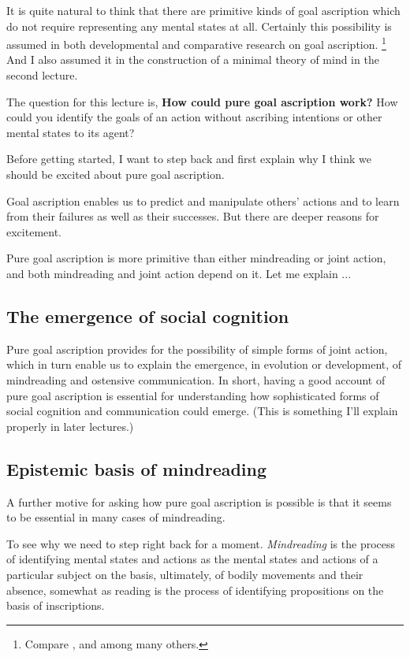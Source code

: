 \documentclass[12pt,\papersize]{extarticle}
\begin{document}
It is quite natural to think that there are primitive kinds of goal ascription which do not require  representing any mental states at all.
Certainly this possibility is assumed  in both developmental and comparative research on goal ascription.%
\footnote{ 
Compare \citet{Gergely:1995sq},
	\citet{Woodward:1998dm} and
	\citet{Penn:2007ey}
among many others.
}
And I also assumed it in the construction of a minimal theory of mind in the second lecture.


The question for this lecture is,
\newcommand{\theQuestion}{How could pure goal ascription work? }
\textbf{\theQuestion} 
How could you identify the goals of an action without ascribing intentions or other mental states to its agent?

Before getting started, I want to step back and first explain why I think we should be excited about pure goal ascription.

Goal ascription enables us to
	predict and manipulate others' actions
	and to learn from their 
		failures 
	as well as their 
		successes.
But there are deeper reasons for excitement.

Pure goal ascription is more primitive than either mindreading or joint action, and both mindreading and joint action depend on it.
Let me explain ...


\subsection{The emergence of social cognition}
Pure goal ascription provides for the possibility of simple forms of joint action,
	which in turn enable us to explain the emergence, in evolution or development, of mindreading and ostensive communication.
In short, having a good account of pure goal ascription is essential for understanding how sophisticated forms of social cognition and communication could emerge.
(This is something I'll explain properly in later lectures.)

\subsection{Epistemic basis of mindreading}
A further motive for asking how pure goal ascription is possible is that it seems to be essential in many cases of mindreading.

To see why we need to step right back for a moment.
\textit{Mindreading} is 
	the process of 
	identifying mental states and actions 
	as the mental states and actions 	of a particular subject 
	on the basis, ultimately, of bodily movements and their absence,
somewhat as reading is the process of identifying propositions on the basis of inscriptions.\citep%
{Apperly:2010kx}
\end{document}
